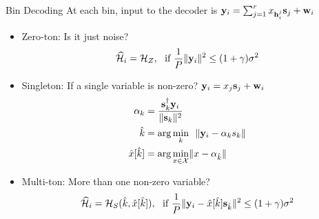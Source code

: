 \begin{frame}{Bin Decoding}
At each bin, input to the decoder is $\mathbf{y}_i=\sum_{j=1}^{r}x_{\mathbf{h}_{i}^{j}}\mathbf{s}_j+\mathbf{w}_i$
\begin{itemize}
\item Zero-ton: Is it just noise?
\begin{equation*}
\widehat{\mathcal{H}}_i=\mathcal{H}_{Z}, ~~\text{if } \frac{1}{P}\lVert{\mathbf{y}_i}\rVert^2\leq (1+\gamma)\sigma^2
\end{equation*}
\item Singleton: If a single variable is non-zero? $\mathbf{y}_i=x_j\mathbf{s}_j+\mathbf{w}_i$
\begin{align*}
\alpha_{k}&=\frac{\mathbf{s}_k^{\dagger}\mathbf{y}_i}{\lVert{\mathbf{s}_k}\rVert^2}\\
\hat{k}&=\arg \min_{k}~~ \lVert{\mathbf{y}_i-\alpha_{k}s_k}\rVert\\
\hat{x}[\hat{k}]&=\arg \min_{x\in\mathcal{X}} \lVert{x-\alpha_{\hat{k}}}\rVert
\end{align*}
\item Multi-ton: More than one non-zero variable?
\begin{equation*}
\widehat{\mathcal{H}}_i=\mathcal{H}_{S}(\hat{k},\hat{x}[\hat{k}]), ~~\text{if } \frac{1}{P}\lVert{\mathbf{y}_{i}-\hat{x}[\hat{k}]\mathbf{s}_{\hat{k}}}\rVert^2\leq (1+\gamma)\sigma^2
\end{equation*}
\end{itemize}
\end{frame}

